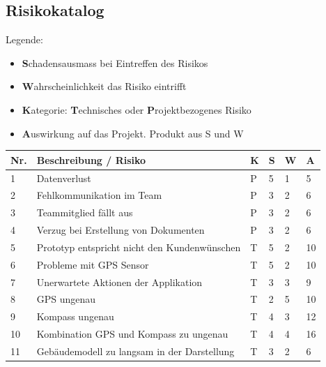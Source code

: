 \documentclass[a4paper]{scrreprt}
\begin{document}
\subsection{Risikokatalog}
\label{sssec:Risikokatalog}
Legende:
\begin{itemize}
	\item \textbf{S}chadensausmass bei Eintreffen des Risikos
	\item \textbf{W}ahrscheinlichkeit das Risiko eintrifft
	\item \textbf{K}ategorie: \textbf{T}echnisches oder \textbf{P}rojektbezogenes Risiko
	\item \textbf{A}uswirkung auf das Projekt. Produkt aus S und W
\end{itemize}

\vspace{1em}
\noindent
\begin{tabularx}{\textwidth}{|l|X|l|l|l||l|}
	\hline
	\textbf{Nr.} & \textbf{Beschreibung / Risiko} & \textbf{K} & \textbf{S} & \textbf{W} & \textbf{A} \\
	\hline
	1 & Datenverlust & P & 5 & 1 & 5\\
	\hline
	2 & Fehlkommunikation im Team & P & 3 & 2 & 6 \\
	\hline
	3 & Teammitglied fällt aus & P & 3 & 2 & 6 \\
	\hline
	4 & Verzug bei Erstellung von Dokumenten & P & 3 & 2 & 6 \\
	\hline
	5 & Prototyp entspricht nicht den Kundenwünschen & T & 5 & 2 & 10 \\
	\hline
	6 & Probleme mit GPS Sensor & T & 5 & 2 & 10 \\
	\hline
	7 & Unerwartete Aktionen der Applikation & T & 3 & 3 & 9\\
	\hline
	8 & GPS ungenau & T & 2 & 5 & 10\\
	\hline
	9 & Kompass ungenau & T & 4 & 3 & 12\\
	\hline
	10 & Kombination GPS und Kompass zu ungenau & T & 4 & 4 & 16\\
	\hline
	11 & Gebäudemodell zu langsam in der Darstellung & T & 3 & 2 & 6\\
	\hline
\end{tabularx}

\vspace{1em}
\end{document}
